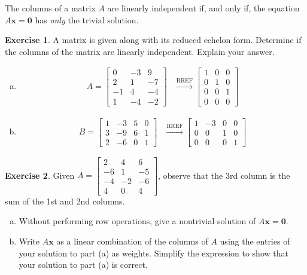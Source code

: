 \documentclass[10pt]{book}
\newcommand{\boxcolor}{gray!30}
\newenvironment{boxdef}{\begin{mdframed}[backgroundcolor=\boxcolor,linewidth=0pt,nobreak=true]}{\end{mdframed}}
\theoremstyle{definition}
\newtheorem{exercise}{Exercise}[section]
\newcommand{\vect}[1]{\ensuremath{\boldsymbol{\mathbf{#1}}}}
\newcommand{\Axz}{A\vect{x}=\vect{0}}
\begin{document}
\begin{boxdef}
	The columns of a matrix $A$ are linearly independent if, and only if, the equation $\Axz$ has \emph{only} the trivial solution.
\end{boxdef}
\begin{exercise} %
	A matrix is given along with its reduced echelon form. Determine if the columns of the matrix are linearly independent. Explain your answer.
	\begin{multicols}{2}
		\begin{enumerate}[(a)]
			\item
				\begin{align*}
				A = \begin{bmatrix}0&-3&9\\2&1&-7\\-1&4&-4\\1&-4&-2\end{bmatrix}
				&\xrightarrow{\text{RREF}}
				\begin{bmatrix}1&0&0\\0&1&0\\0&0&1\\0&0&0\end{bmatrix}
				\end{align*}
			\item 
				\begin{align*}
				B = \begin{bmatrix}1&-3&5&0\\3&-9&6&1\\2&-6&0&1\end{bmatrix}
				&\xrightarrow{\text{RREF}}
				\begin{bmatrix}1&-3&0&0\\0&0&1&0\\0&0&0&1\end{bmatrix}
				\end{align*}
		\end{enumerate}
	\end{multicols}
\end{exercise}
\vfill


\newpage


\begin{exercise} %
	Given $A=\begin{bmatrix}2&4&6\\-6&1&-5\\-4&-2&-6\\4&0&4\end{bmatrix}$, observe that the 3rd column is the sum of the 1st and 2nd columns.
		\begin{enumerate}[(a)]
			\item Without performing row operations, give a nontrivial solution of $\Axz$.
			\vfill
			\item Write $A\vect{x}$ as a linear combination of the columns of $A$ using the entries of your solution to part (a) as weights. Simplify the expression to show that your solution to part (a) is correct.
			\vfill
		\end{enumerate}
\end{exercise}
\end{document}
